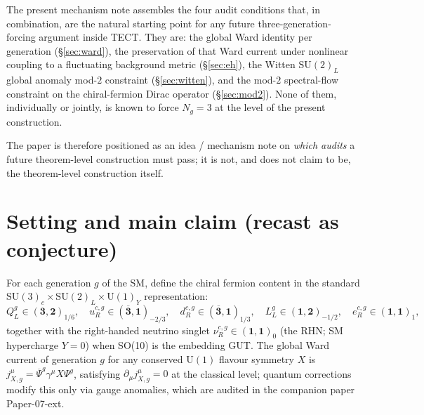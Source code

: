 The present mechanism note assembles the four audit conditions that, in
combination, are the natural starting point for any future
three-generation-forcing argument inside TECT. They are: the global
Ward identity per generation (\S\ref{sec:ward}), the preservation of
that Ward current under nonlinear coupling to a fluctuating background
metric (\S\ref{sec:eh}), the Witten $\mathrm{SU}(2)_L$ global anomaly
mod-$2$ constraint (\S\ref{sec:witten}), and the mod-$2$ spectral-flow
constraint on the chiral-fermion Dirac operator (\S\ref{sec:mod2}).
None of them, individually or jointly, is known to force $N_g = 3$ at
the level of the present construction.

The paper is therefore positioned as an idea / mechanism note on
\emph{which audits} a future theorem-level construction must pass; it
is not, and does not claim to be, the theorem-level construction
itself.

\section{Setting and main claim (recast as conjecture)}\label{sec:setup}
For each generation $g$ of the SM, define the chiral fermion content
in the standard $\mathrm{SU}(3)_c\times \mathrm{SU}(2)_L\times
\mathrm{U}(1)_Y$ representation:
\begin{equation}\label{eq:sm-content}
  Q_L^g \in (\mathbf{3},\mathbf{2})_{1/6},\quad
  u_R^{c,g}\in (\overline{\mathbf{3}},\mathbf{1})_{-2/3},\quad
  d_R^{c,g}\in (\overline{\mathbf{3}},\mathbf{1})_{1/3},\quad
  L_L^g\in (\mathbf{1},\mathbf{2})_{-1/2},\quad
  e_R^{c,g}\in (\mathbf{1},\mathbf{1})_{1},
\end{equation}
together with the right-handed neutrino singlet
$\nu_R^{c,g}\in (\mathbf{1},\mathbf{1})_0$ (the RHN; SM hypercharge
$Y=0$) when SO(10) is the embedding GUT. The global Ward current of
generation $g$ for any conserved $\mathrm{U}(1)$ flavour symmetry $X$
is $j^{\mu}_{X,g}=\overline{\Psi}^g\gamma^{\mu}X\Psi^g$, satisfying
$\partial_\mu j^{\mu}_{X,g}=0$ at the classical level; quantum
corrections modify this only via gauge anomalies, which are audited in
the companion paper Paper-07-ext.


